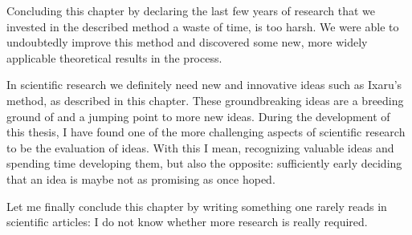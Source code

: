 Concluding this chapter by declaring the last few years of research that we invested in the described method a waste of time, is too harsh. We were able to undoubtedly improve this method and discovered some new, more widely applicable theoretical results in the process.

In scientific research we definitely need new and innovative ideas such as Ixaru's method, as described in this chapter. These groundbreaking ideas are a breeding ground of and a jumping point to more new ideas. During the development of this thesis, I have found one of the more challenging aspects of scientific research to be the evaluation of ideas. With this I mean, recognizing valuable ideas and spending time developing them, but also the opposite: sufficiently early deciding that an idea is maybe not as promising as once hoped.

Let me finally conclude this chapter by writing something one rarely reads in scientific articles: I do not know whether more research is really required.

\stopchapter
